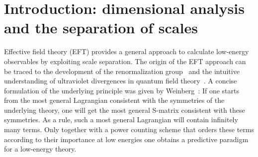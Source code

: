 \author{Hans-Werner Hammer and Sebastian K\"onig}

\graphicspath{{Chapter4-figures/}}

\maketitle
{}



%
\section{Introduction: dimensional analysis and the separation of scales}
\label{sec:EFT-Intro}

Effective field theory (EFT) provides a general approach to calculate low-energy 
observables by exploiting scale separation.  The origin of the EFT approach can 
be traced to the development of the renormalization group~\cite{Wilson-83} and 
the intuitive understanding of ultraviolet divergences in quantum field 
theory~\cite{Lepage-89}.  A concise formulation of the underlying principle was 
given by Weinberg~\cite{Weinberg:1978kz}: If one 
starts from the most general Lagrangian consistent with the symmetries of the 
underlying theory, one will get the most general S-matrix consistent with these 
symmetries.  As a rule, such a most general Lagrangian will contain infinitely 
many terms.  Only together with a power counting scheme that orders these terms 
according to their importance at low energies one obtains a predictive paradigm 
for a low-energy theory.

